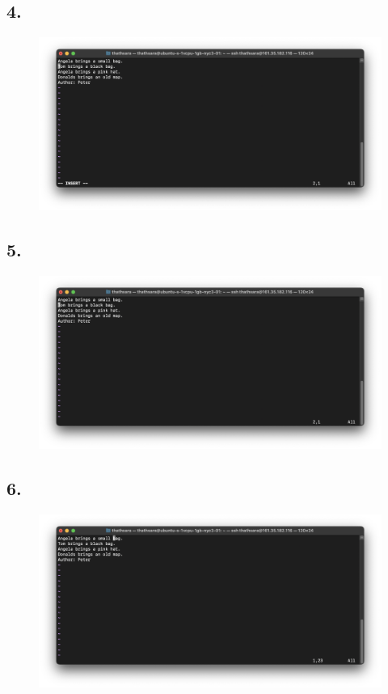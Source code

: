 \documentclass{article}
\begin{document}
    \subsection*{4.}
    \begin{figure}[H]
        \centering
        \includegraphics[width=\textwidth]{2/4.png}
    \end{figure}

    \subsection*{5.}
    \begin{figure}[H]
        \centering
        \includegraphics[width=\textwidth]{2/5.png}
    \end{figure}

    \subsection*{6.}
    \begin{figure}[H]
        \centering
        \includegraphics[width=\textwidth]{2/6.png}
    \end{figure}
\end{document}
